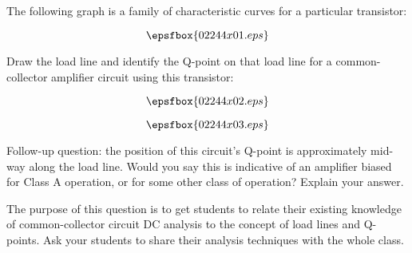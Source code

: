 

The following graph is a family of characteristic curves for a particular transistor:

$$\epsfbox{02244x01.eps}$$

Draw the load line and identify the Q-point on that load line for a common-collector amplifier circuit using this transistor:

$$\epsfbox{02244x02.eps}$$







$$\epsfbox{02244x03.eps}$$

\vskip 10pt

Follow-up question: the position of this circuit's Q-point is approximately mid-way along the load line.  Would you say this is indicative of an amplifier biased for Class A operation, or for some other class of operation?  Explain your answer.







The purpose of this question is to get students to relate their existing knowledge of common-collector circuit DC analysis to the concept of load lines and Q-points.  Ask your students to share their analysis techniques with the whole class.





